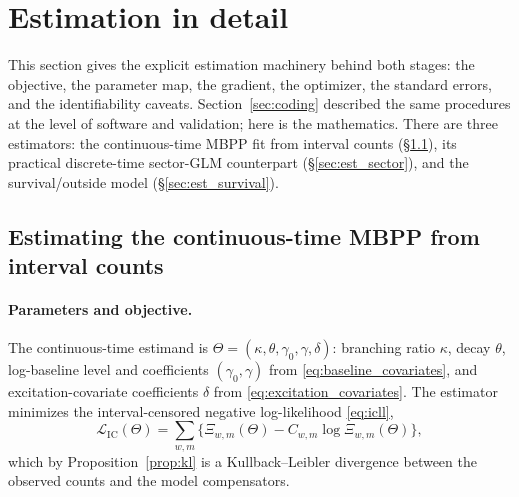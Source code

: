 \documentclass[11pt]{article}
\theoremstyle{plain}
\theoremstyle{definition}
\theoremstyle{remark}
\newcommand{\cL}{\mathcal{L}}
\begin{document}
\section{Estimation in detail}
\label{sec:estimation}

This section gives the explicit estimation machinery behind both stages: the objective, the parameter map, the gradient, the optimizer, the standard errors, and the identifiability caveats. Section~\ref{sec:coding} described the same procedures at the level of software and validation; here is the mathematics. There are three estimators: the continuous-time MBPP fit from interval counts (\S\ref{sec:est_mbpp}), its practical discrete-time sector-GLM counterpart (\S\ref{sec:est_sector}), and the survival/outside model (\S\ref{sec:est_survival}).

\subsection{Estimating the continuous-time MBPP from interval counts}
\label{sec:est_mbpp}

\paragraph{Parameters and objective.}
The continuous-time estimand is $\Theta=(\kappa,\theta,\gamma_0,\gamma,\delta)$: branching ratio $\kappa$, decay $\theta$, log-baseline level and coefficients $(\gamma_0,\gamma)$ from \eqref{eq:baseline_covariates}, and excitation-covariate coefficients $\delta$ from \eqref{eq:excitation_covariates}. The estimator minimizes the interval-censored negative log-likelihood \eqref{eq:icll},
\[
\cL_{\mathrm{IC}}(\Theta)=\sum_{w,m}\big\{\Xi_{w,m}(\Theta)-C_{w,m}\log\Xi_{w,m}(\Theta)\big\},
\]
which by Proposition~\ref{prop:kl} is a Kullback--Leibler divergence between the observed counts and the model compensators.
\end{document}
